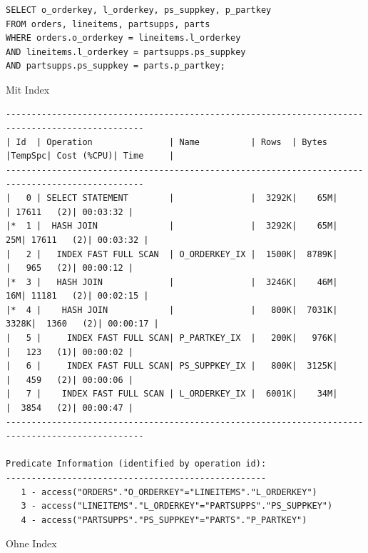 \documentclass[10pt]{article}
\begin{document}
\newpage
\begin{lstlisting}[style=sql]
SELECT o_orderkey, l_orderkey, ps_suppkey, p_partkey
FROM orders, lineitems, partsupps, parts
WHERE orders.o_orderkey = lineitems.l_orderkey
AND lineitems.l_orderkey = partsupps.ps_suppkey
AND partsupps.ps_suppkey = parts.p_partkey;
\end{lstlisting}
Mit Index
\begin{lstlisting}[style=queryexecutionplanSmall]
-------------------------------------------------------------------------------------------------
| Id  | Operation               | Name          | Rows  | Bytes |TempSpc| Cost (%CPU)| Time     |
-------------------------------------------------------------------------------------------------
|   0 | SELECT STATEMENT        |               |  3292K|    65M|       | 17611   (2)| 00:03:32 |
|*  1 |  HASH JOIN              |               |  3292K|    65M|    25M| 17611   (2)| 00:03:32 |
|   2 |   INDEX FAST FULL SCAN  | O_ORDERKEY_IX |  1500K|  8789K|       |   965   (2)| 00:00:12 |
|*  3 |   HASH JOIN             |               |  3246K|    46M|    16M| 11181   (2)| 00:02:15 |
|*  4 |    HASH JOIN            |               |   800K|  7031K|  3328K|  1360   (2)| 00:00:17 |
|   5 |     INDEX FAST FULL SCAN| P_PARTKEY_IX  |   200K|   976K|       |   123   (1)| 00:00:02 |
|   6 |     INDEX FAST FULL SCAN| PS_SUPPKEY_IX |   800K|  3125K|       |   459   (2)| 00:00:06 |
|   7 |    INDEX FAST FULL SCAN | L_ORDERKEY_IX |  6001K|    34M|       |  3854   (2)| 00:00:47 |
-------------------------------------------------------------------------------------------------
 
Predicate Information (identified by operation id):
---------------------------------------------------
   1 - access("ORDERS"."O_ORDERKEY"="LINEITEMS"."L_ORDERKEY")
   3 - access("LINEITEMS"."L_ORDERKEY"="PARTSUPPS"."PS_SUPPKEY")
   4 - access("PARTSUPPS"."PS_SUPPKEY"="PARTS"."P_PARTKEY")
\end{lstlisting}
Ohne Index
\end{document}

